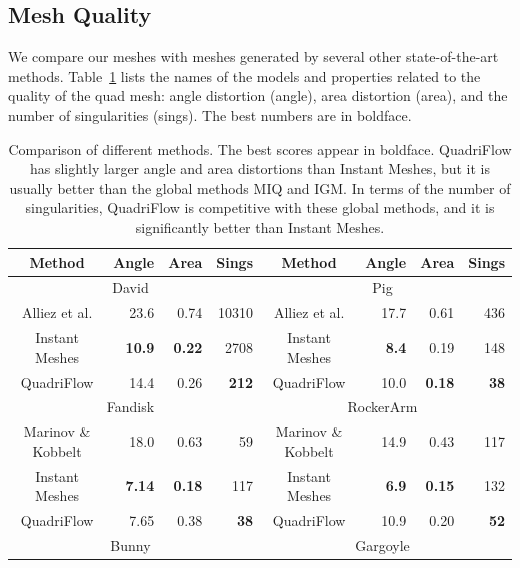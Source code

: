 \subsection{Mesh Quality}

We compare our meshes with meshes generated by several other state-of-the-art methods. Table~\ref{tab:quad-statistics} lists the names of the models and properties related to the quality of the quad mesh: angle distortion (angle), area distortion (area), and the number of singularities (sings). The best numbers are in boldface.

\begin{table}
\caption{Comparison of different methods. The best scores appear in boldface. QuadriFlow has slightly larger angle and area distortions than Instant Meshes, but it is usually better than the global methods MIQ and IGM. In terms of the number of singularities, QuadriFlow is competitive with these global methods, and it is significantly better than Instant Meshes.
\label{tab:quad-statistics}
}
\centering
\begin{tabular}{|c|r|r|r|c|r|r|r|}
\hline
Method & Angle & Area & Sings &
Method & Angle & Area & Sings \\
\hline
\multicolumn{4}{|c|}{David~\cite{alliez2003anisotropic}}  & \multicolumn{4}{c|}{Pig~\cite{alliez2003anisotropic}}  \\
\hline
Alliez et al. & 23.6 & 0.74 & 10310 & Alliez et al. & 17.7 & 0.61 & 436 \\
\hline
Instant Meshes & \textbf{10.9} & \textbf{0.22} & 2708 & Instant Meshes & \textbf{8.4} & 0.19 & 148 \\
\hline
QuadriFlow & 14.4 & 0.26 & \textbf{212} & QuadriFlow & 10.0 & \textbf{0.18} & \textbf{38} \\
\hline
\multicolumn{4}{|c|}{Fandisk~\cite{marinov2006robust}} & \multicolumn{4}{c|}{RockerArm~\cite{marinov2006robust}}  \\
\hline
Marinov \& Kobbelt & 18.0 & 0.63 & 59 & Marinov \& Kobbelt & 14.9 & 0.43 & 117 \\
\hline
Instant Meshes & \textbf{7.14} & \textbf{0.18} & 117 & Instant Meshes & \textbf{6.9} & \textbf{0.15} & 132 \\
\hline
QuadriFlow & 7.65 & 0.38 & \textbf{38} & QuadriFlow & 10.9 & 0.20 & \textbf{52} \\
\hline
\multicolumn{4}{|c|}{Bunny~\cite{tarini2010practical}} & \multicolumn{4}{c|}{Gargoyle~\cite{tarini2010practical}}  \\

\end{tabular}
\end{table}
